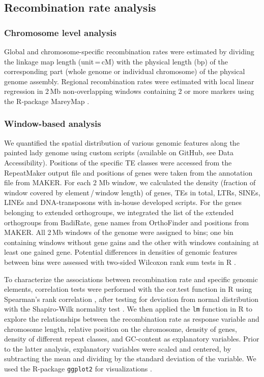 \documentclass[twocolumn]{bmcart}%
\begin{document}
\subsection*{Recombination rate analysis}
\subsubsection*{Chromosome level analysis}
Global and chromosome-specific recombination rates were estimated by dividing the linkage map length (unit\,=\,cM) with the physical length (bp) of the corresponding part (whole genome or individual chromosome) of the physical genome assembly. Regional recombination rates were estimated with local linear regression in 2\,Mb non-overlapping windows containing 2 or more markers using the R-package MareyMap \citep{rezvoyMareyMapRbasedTool2007}. 
\subsubsection*{Window-based analysis}
We quantified the spatial distribution of various genomic features along the painted lady genome using custom scripts (available on GitHub, see Data Accessibility). Positions of the specific TE classes were accessed from the RepeatMaker output file and positions of genes were taken from the annotation file from MAKER. For each 2 Mb window, we calculated the density (fraction of window covered by element\,/\,window length) of genes, TEs in total, LTRs, SINEs, LINEs and DNA-transposons with in-house developed scripts. For the genes belonging to extended orthogroups, we integrated the list of the extended orthogroups from BadiRate, gene names from OrthoFinder and positions from MAKER. All 2\,Mb windows of the genome were assigned to bins; one bin containing windows without gene gains and the other with windows containing at least one gained gene. Potential differences in densities of genomic features between bins were assessed with two-sided Wilcoxon rank sum tests in R \citep{bauerConstructingConfidenceSets1972}.

To characterize the associations between recombination rate and specific genomic elements, correlation tests were performed with the cor.test function in R using Spearman’s rank correlation \citep{bestAlgorithm89Upper1975}, after testing for deviation from normal distribution with the Shapiro-Wilk normality test \citep{roystonExtensionShapiroWilk1982}. We then applied the \texttt{lm} function in R to explore the relationships between the recombination rate as response variable and chromosome length, relative position on the chromosome, density of genes, density of different repeat classes, and GC-content as explanatory variables. Prior to the latter analysis, explanatory variables were scaled and centered, by subtracting the mean and dividing by the standard deviation of the variable. We used the R-package \texttt{ggplot2} for visualizations \citep{wickhamGgplot2ElegantGraphics2009}.
\end{document}
